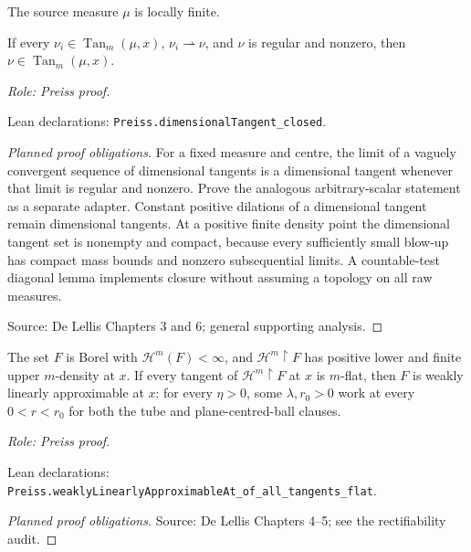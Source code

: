 \begin{lemma}
\label{lem:dimensional-tangent-closed}




The source measure $\mu$ is locally finite.





If every $\nu_i\in\operatorname{Tan}_m(\mu,x)$, $\nu_i\rightharpoonup\nu$, and $\nu$ is regular and nonzero, then $\nu\in\operatorname{Tan}_m(\mu,x)$.
\par\emph{Role: Preiss proof.}
\par Lean declarations: \texttt{Preiss.dimensionalTangent\_closed}.
\end{lemma}
\begin{proof}[Planned proof obligations]

For a fixed measure and centre, the limit of a vaguely convergent sequence of
dimensional tangents is a dimensional tangent whenever that limit is regular
and nonzero. Prove the analogous arbitrary-scalar statement as a separate
adapter. Constant positive dilations of a dimensional tangent remain dimensional
tangents. At a positive finite density point the dimensional tangent set is
nonempty and compact, because every sufficiently small blow-up has compact
mass bounds and nonzero subsequential limits. A countable-test diagonal lemma
implements closure without assuming a topology on all raw measures.
\par Source: De Lellis Chapters 3 and 6; general supporting analysis.
\end{proof}

\begin{lemma}
\label{lem:flat-to-approximation}








The set \(F\) is Borel with \(\mathcal H^m(F)<\infty\), and \(\mathcal H^m\!\restriction F\) has positive lower and finite upper \(m\)-density at \(x\).
If every tangent of \(\mathcal H^m\!\restriction F\) at \(x\) is \(m\)-flat, then \(F\) is weakly linearly approximable at \(x\):
for every \(\eta>0\), some \(\lambda,r_0>0\) work at every \(0<r<r_0\) for both the tube and plane-centred-ball clauses.
\par\emph{Role: Preiss proof.}
\par Lean declarations: \texttt{Preiss.weaklyLinearlyApproximableAt\_of\_all\_tangents\_flat}.
\end{lemma}
\begin{proof}[Planned proof obligations]

\par Source: De Lellis Chapters 4--5; see the rectifiability audit.
\end{proof}

